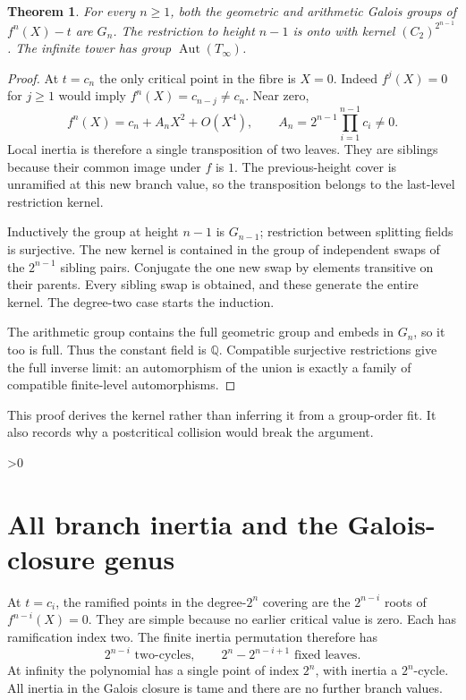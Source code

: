 \documentclass[10pt]{article}
\newtheorem{theorem}{Theorem}
\newcommand{\Aut}{\operatorname{Aut}}
\begin{document}
\begin{theorem}\label{full}
For every $n\ge1$, both the geometric and arithmetic Galois groups of
$f^n(X)-t$ are $G_n$. The restriction to height $n-1$ is onto with kernel
$(C_2)^{2^{n-1}}$. The infinite tower has group $\Aut(T_\infty)$.
\end{theorem}
\begin{proof}
At $t=c_n$ the only critical point in the fibre is $X=0$.
Indeed $f^j(X)=0$ for $j\ge1$ would imply
$f^n(X)=c_{n-j}\ne c_n$. Near zero,
\[
 f^n(X)=c_n+A_nX^2+O(X^4),\qquad
 A_n=2^{n-1}\prod_{i=1}^{n-1}c_i\ne0.
\]
Local inertia is therefore a single transposition of two leaves.
They are siblings because their common image under $f$ is $1$.
The previous-height cover is unramified at this new branch value, so
the transposition belongs to the last-level restriction kernel.

Inductively the group at height $n-1$ is $G_{n-1}$; restriction between
splitting fields is surjective. The new kernel is contained in the group
of independent swaps of the $2^{n-1}$ sibling pairs.
Conjugate the one new swap by elements transitive on their parents.
Every sibling swap is obtained, and these generate the entire kernel.
The degree-two case starts the induction.

The arithmetic group contains the full geometric group and embeds in
$G_n$, so it too is full. Thus the constant field is $\mathbb Q$.
Compatible surjective restrictions give the full inverse limit:
an automorphism of the union is exactly a family of compatible
finite-level automorphisms.
\end{proof}
This proof derives the kernel rather than inferring it from a group-order
fit. It also records why a postcritical collision would break the argument.

\ifnum\CRevisionRound>0
\section{All branch inertia and the Galois-closure genus}
At $t=c_i$, the ramified points in the degree-$2^n$ covering are the
$2^{n-i}$ roots of $f^{n-i}(X)=0$. They are simple because no earlier
critical value is zero. Each has ramification index two.
The finite inertia permutation therefore has
\[
 2^{n-i}\text{ two-cycles},\qquad
 2^n-2^{n-i+1}\text{ fixed leaves}.
\]
At infinity the polynomial has a single point of index $2^n$, with
inertia a $2^n$-cycle. All inertia in the Galois closure is tame and
there are no further branch values.
\end{document}
